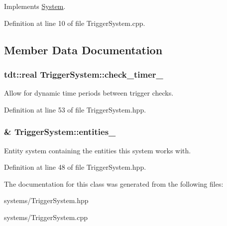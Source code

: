 Implements \hyperlink{class_system_a6d54c9bd38eb43d620a1451cb0925472}{System}.



Definition at line 10 of file Trigger\+System.\+cpp.



\subsection{Member Data Documentation}
\subsubsection[{\texorpdfstring{check\+\_\+timer\+\_\+}{check_timer_}}]{\setlength{\rightskip}{0pt plus 5cm}tdt\+::real Trigger\+System\+::check\+\_\+timer\+\_\+\hspace{0.3cm}{\ttfamily [private]}}\hypertarget{class_trigger_system_aba660b6e6bc34da77baa397ffa6d5065}{}\label{class_trigger_system_aba660b6e6bc34da77baa397ffa6d5065}


Allow for dynamic time periods between trigger checks. 



Definition at line 53 of file Trigger\+System.\+hpp.

\subsubsection[{\texorpdfstring{entities\+\_\+}{entities_}}]{\& Trigger\+System\+::entities\+\_\+\hspace{0.3cm}{\ttfamily [private]}}\hypertarget{class_trigger_system_a0edd666bdf0821155829c2b3d22b1344}{}\label{class_trigger_system_a0edd666bdf0821155829c2b3d22b1344}


Entity system containing the entities this system works with. 



Definition at line 48 of file Trigger\+System.\+hpp.



The documentation for this class was generated from the following files\+:\begin{DoxyCompactItemize}
\item 
systems/Trigger\+System.\+hpp\item 
systems/Trigger\+System.\+cpp\end{DoxyCompactItemize}
